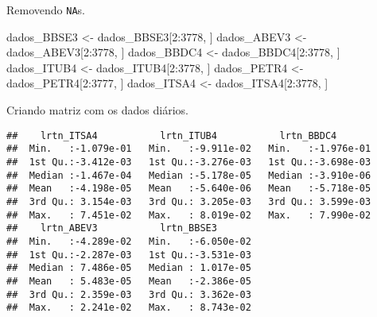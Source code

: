 \documentclass[]{article}
\newenvironment{Shaded}{\begin{snugshade}}{\end{snugshade}}
\newcommand{\KeywordTok}[1]{\textcolor[rgb]{0.13,0.29,0.53}{\textbf{{#1}}}}
\newcommand{\DataTypeTok}[1]{\textcolor[rgb]{0.13,0.29,0.53}{{#1}}}
\newcommand{\DecValTok}[1]{\textcolor[rgb]{0.00,0.00,0.81}{{#1}}}
\newcommand{\StringTok}[1]{\textcolor[rgb]{0.31,0.60,0.02}{{#1}}}
\newcommand{\NormalTok}[1]{{#1}}
\begin{document}
Removendo \texttt{NA}s.

\begin{Shaded}
\begin{Highlighting}[]
\NormalTok{dados_BBSE3 <-}\StringTok{ }\NormalTok{dados_BBSE3[}\DecValTok{2}\NormalTok{:}\DecValTok{3778}\NormalTok{, ]}
\NormalTok{dados_ABEV3 <-}\StringTok{ }\NormalTok{dados_ABEV3[}\DecValTok{2}\NormalTok{:}\DecValTok{3778}\NormalTok{, ]}
\NormalTok{dados_BBDC4 <-}\StringTok{ }\NormalTok{dados_BBDC4[}\DecValTok{2}\NormalTok{:}\DecValTok{3778}\NormalTok{, ]}
\NormalTok{dados_ITUB4 <-}\StringTok{ }\NormalTok{dados_ITUB4[}\DecValTok{2}\NormalTok{:}\DecValTok{3778}\NormalTok{, ]}
\NormalTok{dados_PETR4 <-}\StringTok{ }\NormalTok{dados_PETR4[}\DecValTok{2}\NormalTok{:}\DecValTok{3777}\NormalTok{, ]}
\NormalTok{dados_ITSA4 <-}\StringTok{ }\NormalTok{dados_ITSA4[}\DecValTok{2}\NormalTok{:}\DecValTok{3778}\NormalTok{, ]}
\end{Highlighting}
\end{Shaded}

Criando matriz com os dados diários.

\begin{Shaded}
\end{Shaded}

\begin{verbatim}
##    lrtn_ITSA4           lrtn_ITUB4           lrtn_BBDC4        
##  Min.   :-1.079e-01   Min.   :-9.911e-02   Min.   :-1.976e-01  
##  1st Qu.:-3.412e-03   1st Qu.:-3.276e-03   1st Qu.:-3.698e-03  
##  Median :-1.467e-04   Median :-5.178e-05   Median :-3.910e-06  
##  Mean   :-4.198e-05   Mean   :-5.640e-06   Mean   :-5.718e-05  
##  3rd Qu.: 3.154e-03   3rd Qu.: 3.205e-03   3rd Qu.: 3.599e-03  
##  Max.   : 7.451e-02   Max.   : 8.019e-02   Max.   : 7.990e-02  
##    lrtn_ABEV3           lrtn_BBSE3        
##  Min.   :-4.289e-02   Min.   :-6.050e-02  
##  1st Qu.:-2.287e-03   1st Qu.:-3.531e-03  
##  Median : 7.486e-05   Median : 1.017e-05  
##  Mean   : 5.483e-05   Mean   :-2.386e-05  
##  3rd Qu.: 2.359e-03   3rd Qu.: 3.362e-03  
##  Max.   : 2.241e-02   Max.   : 8.743e-02
\end{verbatim}
\end{document}
